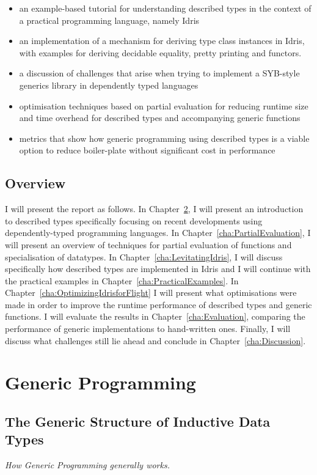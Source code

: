 \documentclass{ituthesis}
\begin{document}
\begin{itemize}
  \item an example-based tutorial for understanding described types in the context of a practical programming language, namely Idris
  \item an implementation of a mechanism for deriving type class instances in Idris, with examples for deriving decidable equality, pretty printing and functors.
  \item a discussion of challenges that arise when trying to implement a SYB-style generics library in dependently typed languages
  \item optimisation techniques based on partial evaluation for reducing runtime size and time overhead for described types and accompanying generic functions
  \item metrics that show how generic programming using described types is a viable option to reduce boiler-plate without significant cost in performance
\end{itemize}
\section{Overview}
\label{sec:Overview}
I will present the report as follows. In Chapter~\ref{cha:GenericProgramming}, I will present an introduction to described types specifically focusing on recent developments using dependently-typed programming languages.
In Chapter~\ref{cha:PartialEvaluation}, I will present an overview of techniques for partial evaluation of functions and specialisation of datatypes. In Chapter~\ref{cha:LevitatingIdris}, I will discuss specifically how described types are implemented in Idris and I will continue with the practical examples in Chapter~\ref{cha:PracticalExamples}.
In Chapter~\ref{cha:OptimizingIdrisforFlight} I will present what optimisations were made in order to improve the runtime performance of described types and generic functions. I will evaluate the results in Chapter~\ref{cha:Evaluation}, comparing the performance of generic implementations to hand-written ones.
Finally, I will discuss what challenges still lie ahead and conclude in Chapter~\ref{cha:Discussion}.
\chapter{Generic Programming}
\label{cha:GenericProgramming}
\section{The Generic Structure of Inductive Data Types}
\label{sec:TheGenericStructureofInductiveDataTypes}
\textit{How Generic Programming generally works.}
\end{document}
